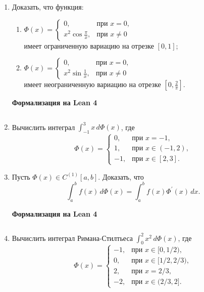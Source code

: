 \documentclass[12pt,a4paper]{article}
\begin{document}
\begin{enumerate}
\newpage
\item Доказать, что функция:
\begin{enumerate}[label=\alph*)]
\item $\Phi(x) =
\begin{cases} 0, & \text{при } x=0, \\ x^{2} \cos\frac{\pi}{x}, & \text{при } x\ne0
\end{cases}$ \\ имеет ограниченную вариацию на отрезке $[0, 1]$;
\item $\Phi(x) =
\begin{cases} 0, & \text{при } x=0, \\ x^{2} \sin\frac{1}{x}, & \text{при } x\ne0
\end{cases}$ \\ имеет неограниченную вариацию на отрезке $[0, \frac{2}{\pi}]$.
\end{enumerate}


\begin{center}\small\textbf{Формализация на Lean 4}\end{center}
\inputminted{lean}{FunAn/Section05_BVandRS/Task05.lean}

\newpage

\item Вычислить интеграл $\int_{-1}^{3} x \, d\Phi(x)$, где
$$\Phi(x) =
\begin{cases} 0, & \text{при } x=-1, \\ 1, & \text{при } x\in(-1, 2), \\ -1, & \text{при } x\in[2, 3].
\end{cases}$$

\newpage
\item Пусть $\Phi(x) \in C^{(1)}[a, b]$. Доказать, что
$$\int_{a}^{b} f(x) \, d\Phi(x) = \int_{a}^{b} f(x)\Phi^{\prime}(x) \, dx.$$


\begin{center}\small\textbf{Формализация на Lean 4}\end{center}
\inputminted{lean}{FunAn/Section05_BVandRS/Task07.lean}

\newpage

\item Вычислить интеграл Римана-Стилтьеса $\int_{0}^{2} x^{2} \, d\Phi(x)$, где
$$\Phi(x) =
\begin{cases} -1, & \text{при } x\in[0, 1/2), \\ 0, & \text{при } x\in[1/2, 2/3), \\ 2, & \text{при } x=2/3, \\ -2, & \text{при } x\in(2/3, 2].
\end{cases}$$


\end{enumerate}
\end{document}
